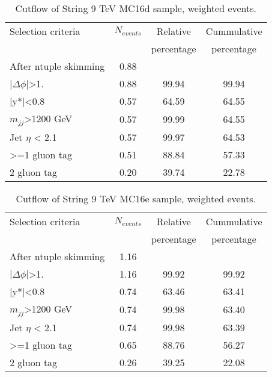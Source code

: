 \begin{table}[ht]
\begin{center}
\begin{tabular}{|l|c|c|c|}
\hline
Selection criteria & $N_{events}$ & Relative & Cummulative \\
 & & percentage & percentage \\
\hline
After ntuple skimming & 0.88 &  &  \\
$|\Delta\phi|$>1. & 0.88 & 99.94 & 99.94 \\
|y*|<0.8 & 0.57 & 64.59 & 64.55 \\
$m_{jj}$>1200 GeV & 0.57 & 99.99 & 64.55 \\
Jet $\eta$ < 2.1 & 0.57 & 99.97 & 64.53 \\
>=1 gluon tag & 0.51 & 88.84 & 57.33 \\
2 gluon tag & 0.20 & 39.74 & 22.78 \\
\hline
\end{tabular}
\end{center}
\caption{Cutflow of String 9 TeV MC16d sample, weighted events.}
\end{table}

\begin{table}[ht]
\begin{center}
\begin{tabular}{|l|c|c|c|}
\hline
Selection criteria & $N_{events}$ & Relative & Cummulative \\
 & & percentage & percentage \\
\hline
After ntuple skimming & 1.16 &  &  \\
$|\Delta\phi|$>1. & 1.16 & 99.92 & 99.92 \\
|y*|<0.8 & 0.74 & 63.46 & 63.41 \\
$m_{jj}$>1200 GeV & 0.74 & 99.98 & 63.40 \\
Jet $\eta$ < 2.1 & 0.74 & 99.98 & 63.39 \\
>=1 gluon tag & 0.65 & 88.76 & 56.27 \\
2 gluon tag & 0.26 & 39.25 & 22.08 \\
\hline
\end{tabular}
\end{center}
\caption{Cutflow of String 9 TeV MC16e sample, weighted events.}
\label{tab:String9MC16e}
\end{table}

